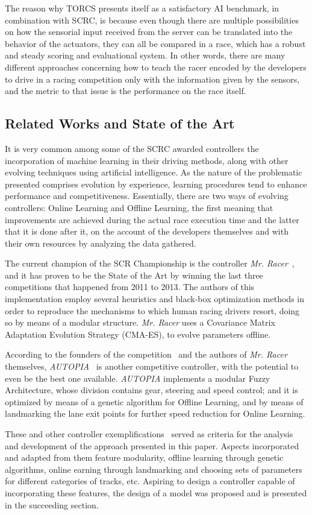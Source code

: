 	The reason why TORCS presents itself as a satisfactory AI benchmark, in combination with SCRC, is because even	though there are multiple possibilities on how the sensorial input received from the server can be translated into the behavior of the actuators, they can all be compared in a race, which has a robust and steady scoring and evaluational system. In other words, there are many different approaches concerning how to teach the racer encoded by the developers to drive in a racing competition only with the information given by the sensors, and the metric to that issue is the performance on the race itself.

\subsection{Related Works and State of the Art} \label{subsec:Related}
	
	It is very common among some of the SCRC awarded controllers the incorporation of machine learning in their driving methods, along with other evolving techniques using artificial intelligence. As the nature of the problematic presented comprises evolution by experience, learning procedures tend to enhance performance and competitiveness. Essentially, there are two ways of evolving controllers: Online Learning and Offline Learning, the first meaning that improvements are achieved during the actual race execution time and the latter that it is done after it, on the account of the developers themselves and with their own resources by analyzing the data gathered.
	
	The current champion of the SCR Championship is the controller \emph{Mr. Racer}~\cite{MrRacer}, and it has proven to be the State of the Art by winning the last three competitions that happened from 2011 to 2013. The authors of this implementation employ several heuristics and black-box optimization methods in order to reproduce the mechanisms to which human racing drivers resort, doing so by means of a modular structure. \emph{Mr. Racer} uses a Covariance Matrix Adaptation Evolution Strategy (CMA-ES), to evolve parameters offline.
	
	According to the founders of the competition~\cite{SCRC} and the authors of \emph{Mr. Racer} themselves, \emph{AUTOPIA}~\cite{AUTOPIA} is another competitive controller, with the potential to even be the best one available. \emph{AUTOPIA} implements a modular Fuzzy Architecture, whose division contains gear, steering and speed control; and it is optimized by means of a genetic algorithm for Offline Learning, and by means of landmarking the lane exit points for further speed reduction for Online Learning.
	
	These and other controller exemplifications~\cite{SCRC} served as criteria for the analysis and development of the approach presented in this paper. Aspects incorporated and adapted from them feature modularity, offline learning through genetic algorithms, online earning through landmarking and choosing sets of parameters for different categories of tracks, etc. Aspiring to design a controller capable of incorporating these features, the design of a model was proposed and is presented in the succeeding section.
	
